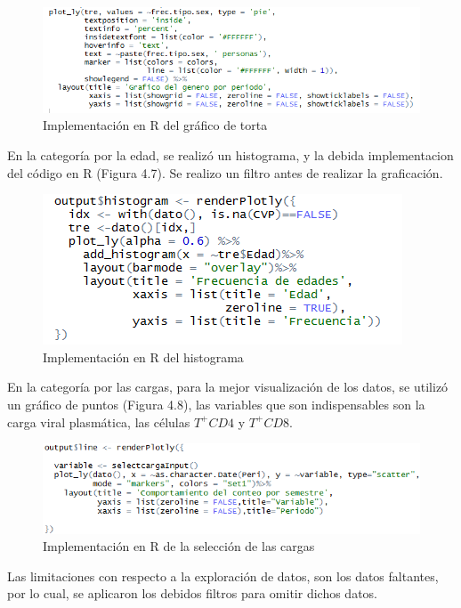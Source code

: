\begin{figure}[H]
\centering
\includegraphics[scale=0.8]{torta.PNG}
\caption{Implementaci\'on en R del gr\'afico de torta}
\end{figure}

En la categor\'ia por la edad, se realiz\'o un histograma, y la debida implementacion del c\'odigo en R (Figura 4.7). Se realizo un filtro antes de realizar la graficaci\'on.

\begin{figure}[H]
\centering
\includegraphics[scale=0.8]{histogram.PNG}
\caption{Implementaci\'on en R del histograma}
\end{figure}

En la categor\'ia por las cargas, para la mejor visualizaci\'on de los datos, se utiliz\'o un gr\'afico de puntos (Figura 4.8), las variables que son indispensables son la carga viral plasm\'atica, las c\'elulas $T^{+}CD4$ y $T^{+}CD8$. \\

\begin{figure}[H]
\centering
\includegraphics[scale=0.8]{ca.PNG}
\caption{Implementaci\'on en R de la selecci\'on de las cargas}
\end{figure}

Las limitaciones con respecto a la exploraci\'on de datos, son los datos faltantes, por lo cual, se aplicaron los debidos filtros para omitir dichos datos.\\

